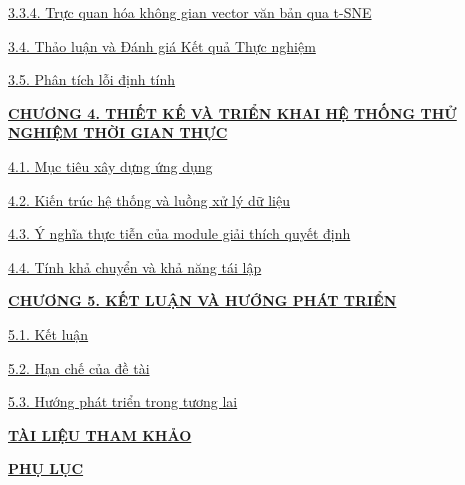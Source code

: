 \documentclass[12pt,a4paper]{article}
\begin{document}
{\hspace*{1.6cm}\hyperref[sec:tsne_visualization]{3.3.4. Trực quan hóa không gian vector văn bản qua t-SNE \dotfill \pageref*{sec:tsne_visualization}}\par
\hspace*{0.8cm}\hyperref[sec:discussion]{3.4. Thảo luận và Đánh giá Kết quả Thực nghiệm \dotfill \pageref*{sec:discussion}}\par
\hspace*{0.8cm}\hyperref[sec:error_analysis]{3.5. Phân tích lỗi định tính \dotfill \pageref*{sec:error_analysis}}\par\vspace{2.5pt}

\noindent\hyperref[sec:chuong4_demo]{\textbf{CHƯƠNG 4. THIẾT KẾ VÀ TRIỂN KHAI HỆ THỐNG THỬ NGHIỆM THỜI GIAN THỰC} \dotfill \textbf{\pageref*{sec:chuong4_demo}}}\par
\hspace*{0.8cm}\hyperref[sec:demo_objective]{4.1. Mục tiêu xây dựng ứng dụng \dotfill \pageref*{sec:demo_objective}}\par
\hspace*{0.8cm}\hyperref[sec:demo_architecture]{4.2. Kiến trúc hệ thống và luồng xử lý dữ liệu \dotfill \pageref*{sec:demo_architecture}}\par
\hspace*{0.8cm}\hyperref[sec:demo_xai]{4.3. Ý nghĩa thực tiễn của module giải thích quyết định \dotfill \pageref*{sec:demo_xai}}\par
\hspace*{0.8cm}\hyperref[sec:demo_deployability]{4.4. Tính khả chuyển và khả năng tái lập \dotfill \pageref*{sec:demo_deployability}}\par\vspace{2.5pt}

\noindent\hyperref[sec:chuong5]{\textbf{CHƯƠNG 5. KẾT LUẬN VÀ HƯỚNG PHÁT TRIỂN} \dotfill \textbf{\pageref*{sec:chuong5}}}\par
\hspace*{0.8cm}\hyperref[sec:conclusion]{5.1. Kết luận \dotfill \pageref*{sec:conclusion}}\par
\hspace*{0.8cm}\hyperref[sec:limitations]{5.2. Hạn chế của đề tài \dotfill \pageref*{sec:limitations}}\par
\hspace*{0.8cm}\hyperref[sec:future_work]{5.3. Hướng phát triển trong tương lai \dotfill \pageref*{sec:future_work}}\par\vspace{2.5pt}

\noindent\hyperref[sec:references]{\textbf{TÀI LIỆU THAM KHẢO} \dotfill \textbf{\pageref*{sec:references}}}\par\vspace{1.5pt}
\noindent\hyperref[sec:appendix]{\textbf{PHỤ LỤC} \dotfill \textbf{\pageref*{sec:appendix}}}\par
}
\end{document}
